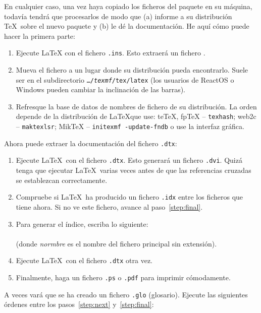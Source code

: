En cualquier caso, una vez haya copiado los ficheros del paquete en su
máquina, todavía tendrá que procesarlos de modo que (a) informe a su
distribución \TeX\ sobre el nuevo paquete y (b) le dé la
documentación.  He aquí cómo puede hacer la primera parte:

\begin{enumerate}
\item Ejecute \LaTeX{} con el fichero \texttt{.ins}.  Esto extraerá un
  fichero .
\item Mueva el fichero  a un lugar donde su distribución
  pueda encontrarlo.  Suele ser en el subdirectorio
  \texttt{\ldots/\emph{texmf}/tex/latex} (los usuarios de ReactOS o
  Windows pueden cambiar la inclinación de las barras).
\item Refresque la base de datos de nombres de fichero de su
  distribución.  La orden depende de la distribución de \LaTeX que use:
  teTeX, fpTeX -- \texttt{texhash}; web2c -- \texttt{maktexlsr};
  MikTeX -- \texttt{initexmf -update-fndb} o use la interfaz gráfica.
\end{enumerate}

\noindent Ahora puede extraer la documentación del fichero \texttt{.dtx}:

\begin{enumerate}
\item Ejecute \LaTeX\ con el fichero \texttt{.dtx}.  Esto generará un fichero
  \texttt{.dvi}.  Quizá tenga que ejecutar  \LaTeX\ varias veces antes
  de que las referencias cruzadas se establezcan correctamente.
\item Compruebe si \LaTeX\ ha producido un fichero \texttt{.idx}
  entre los ficheros que tiene ahora.  Si no ve este fichero, avance
  al paso~\ref{step:final}.
\item Para generar el índice, escriba lo siguiente:\\
        \\
        (donde \textit{normbre} es el nombre del fichero principal sin
        extensión).
 \item Ejecute \LaTeX\ con el fichero \texttt{.dtx} otra vez. \label{step:next}
    
\item Finalmente, haga un fichero \texttt{.ps} o \texttt{.pdf} para
  imprimir cómodamente.\label{step:final}
  
\end{enumerate}

A veces vará que se ha creado un fichero \texttt{.glo} (glosario).
Ejecute las siguientes órdenes entre los pasos~\ref{step:next}
y~\ref{step:final}:

